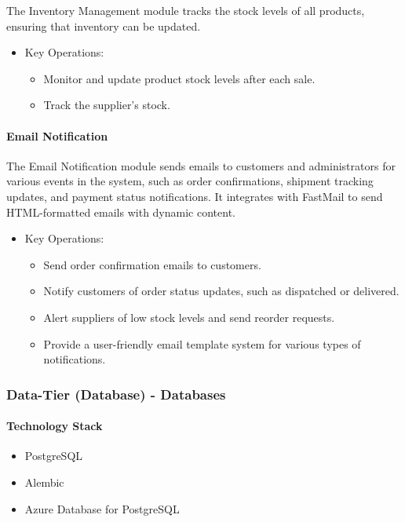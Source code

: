 \documentclass{llncs}
\begin{document}
The Inventory Management module tracks the stock levels of all products, ensuring that inventory can be updated.
\begin{itemize}
    \item Key Operations:
          \begin{itemize}
              \item Monitor and update product stock levels after each sale.
              \item Track the supplier’s stock.
          \end{itemize}
\end{itemize}

\paragraph{Email Notification} \leavevmode

The Email Notification module sends emails to customers and administrators for various events in the system, such as order confirmations, shipment tracking updates, and payment status notifications. It integrates with FastMail to send HTML-formatted emails with dynamic content.
\begin{itemize}
    \item Key Operations:
          \begin{itemize}
              \item Send order confirmation emails to customers.
              \item Notify customers of order status updates, such as dispatched or delivered.
              \item Alert suppliers of low stock levels and send reorder requests.
              \item Provide a user-friendly email template system for various types of notifications.
          \end{itemize}
\end{itemize}

\subsubsection{Data-Tier (Database) - Databases}
\paragraph{Technology Stack}
\begin{itemize}
    \item PostgreSQL
    \item Alembic
    \item Azure Database for PostgreSQL
\end{itemize}
\end{document}
